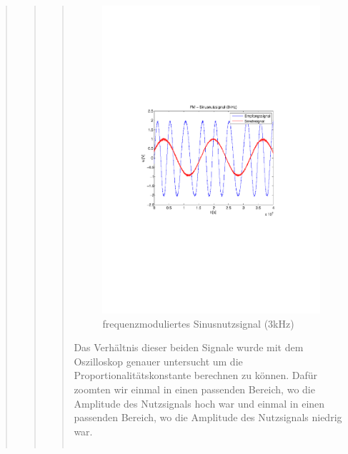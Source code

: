 \begin{quote}
\begin{quote}
\begin{quote}
             \begin{figure}[H] \centering
                    \includegraphics[scale=0.5, trim = 2cm 6.5cm 1.5cm 8.5cm,
                    clip]{./Bilder/fm_sinus(3kHz)}
                        \caption{frequenzmoduliertes Sinusnutzsignal (3kHz)}
                \end{figure}
        
        Das Verhältnis dieser beiden Signale wurde mit dem Oszilloskop genauer
        untersucht um die Proportionalitätskonstante berechnen zu können. Dafür
        zoomten wir einmal in einen passenden Bereich, wo die Amplitude des
        Nutzsignals hoch war und einmal in einen passenden Bereich, wo die
        Amplitude des Nutzsignals niedrig war.
        
         
                \begin{center}
            \begin{tabular}{ll}


\end{tabular}
\end{center}
\end{quote}
\end{quote}
\end{quote}
